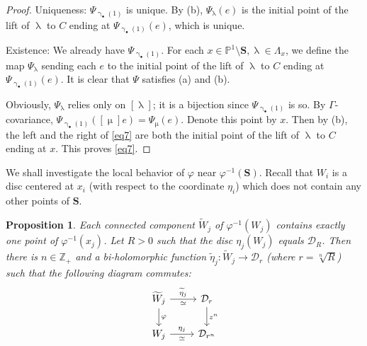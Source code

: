 \documentclass[11pt,b5paper,notitlepage]{article}
\theoremstyle{definition}
\theoremstyle{plain}
\newtheorem{pp}[df]{Proposition}
\newcommand{\mc}{\mathcal}
\newcommand{\wtd}{\widetilde}
\newcommand{\blt}{\bullet}
\newcommand{\Zbb}{\mathbb Z}
\newcommand{\Pbb}{\mathbb P}
\newcommand{\Sbf}{\mathbf{S}}
\numberwithin{equation}{subsection}
\begin{document}
\begin{proof}
Uniqueness: $\Psi_{\upgamma_\blt(1)}$ is unique. By (b), $\Psi_\uplambda(e)$ is the initial point of the lift of $\uplambda$ to $C$ ending at $\Psi_{\upgamma_\blt(1)}(e)$, which is unique.

Existence: We already have $\Psi_{\upgamma_\blt(1)}$. For each $x\in\Pbb^1\setminus\Sbf,\uplambda\in\Lambda_x$, we define the map $\Psi_\uplambda$ sending each $e$ to the initial point of the lift of $\uplambda$ to $C$ ending at $\Psi_{\upgamma_\blt(1)}(e)$. It is clear that $\Psi$ satisfies (a) and (b). 

Obviously, $\Psi_\uplambda$ relies only on $[\uplambda]$; it is a bijection since $\Psi_{\upgamma_\blt(1)}$ is so. By $\Gamma$-covariance, $\Psi_{\upgamma_\blt(1)}([\upmu]e)=\Psi_{\upmu}(e)$. Denote this point by $x$. Then by (b), the left and the right of \eqref{eq7} are both the initial point of the lift of $\uplambda$ to $C$ ending at $x$. This proves \eqref{eq7}.	
\end{proof}










We shall investigate the local behavior of $\varphi$ near $\varphi^{-1}(\Sbf)$. Recall that $W_i$ is a disc centered at $x_i$ (with respect to the coordinate $\eta_i$) which does not contain any other points of $\Sbf$.

\begin{pp}\label{lb5}
Each connected component $\wtd W_j$ of $\varphi^{-1}(W_j)$ contains exactly one point of $\varphi^{-1}(x_j)$. Let $R>0$ such that the disc $\eta_j(W_j)$ equals $\mc D_R$. Then there is $n\in\Zbb_+$ and a bi-holomorphic function $\wtd\eta_j:\wtd W_j\rightarrow\mc D_r$ (where $r=\sqrt[n]R$) such that the following diagram commutes: 
\begin{equation}
\begin{tikzcd}
\wtd W_j \arrow[r, "\wtd\eta_j","\simeq"'] \arrow[d, "\varphi"]
& \mc D_r \arrow[d, "z^n"] \\
W_j \arrow[r,  "\eta_j","\simeq"']
&  \mc D_{r^n}
\end{tikzcd}	\label{eq4}
\end{equation}
\end{pp}
\end{document}
